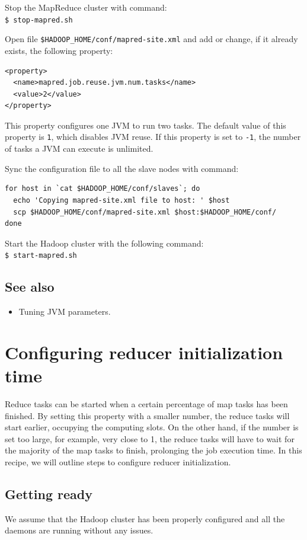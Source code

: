 Stop the MapReduce cluster with command:\\
\verb|$ stop-mapred.sh|

Open file \verb|$HADOOP_HOME/conf/mapred-site.xml| and add or change, if it already exists, the following property:
\lstset{style=bashstyle}
\begin{lstlisting}
<property>
  <name>mapred.job.reuse.jvm.num.tasks</name>
  <value>2</value>
</property>
\end{lstlisting}

This property configures one JVM to run two tasks. The default value of this property is \verb|1|, which disables JVM reuse. If this property is set to \verb|-1|, the number of tasks a JVM can execute is unlimited.

Sync the configuration file to all the slave nodes with command:
\lstset{style=bashstyle}
\begin{lstlisting}
for host in `cat $HADOOP_HOME/conf/slaves`; do
  echo 'Copying mapred-site.xml file to host: ' $host
  scp $HADOOP_HOME/conf/mapred-site.xml $host:$HADOOP_HOME/conf/
done
\end{lstlisting}

Start the Hadoop cluster with the following command: \\
\verb|$ start-mapred.sh|

\subsection*{See also}
\begin{itemize}
  \item Tuning JVM parameters.
\end{itemize}
\section{Configuring reducer initialization time}
Reduce tasks can be started when a certain percentage of map tasks has been finished. By setting this property with a smaller number, the reduce tasks will start earlier, occupying the computing slots. On the other hand, if the number is set too large, for example, very close to 1, the reduce tasks will have to wait for the majority of the map tasks to finish, prolonging the job execution time. In this recipe, we will outline steps to configure reducer initialization.
\subsection*{Getting ready}
We assume that the Hadoop cluster has been properly configured and all the daemons are running without any issues.

